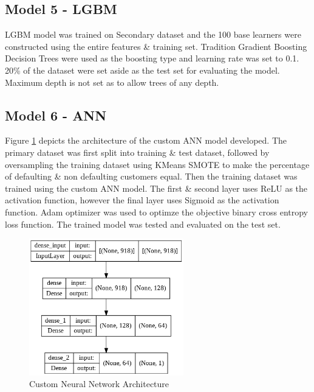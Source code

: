 \documentclass[twoside,11pt,a4paper]{article}
\begin{document}
\subsection{Model 5 - \acf{LGBM}}
\acs{LGBM} model was trained on Secondary dataset and the 100 base learners were constructed using the entire features \& training set. Tradition Gradient Boosting Decision Trees were used as the boosting type and learning rate was set to 0.1. 20\% of the dataset were set aside as the test set for evaluating the model. Maximum depth is not set as to allow trees of any depth. 

\subsection{Model 6 - \acf{ANN}}
Figure \ref{fig:nn_arch} depicts the architecture of the custom \acs{ANN} model developed.  The primary dataset was first split into training \& test dataset, followed by oversampling the training dataset using KMeans \acs{SMOTE} to make the percentage of defaulting \& non defaulting customers equal. Then the training dataset was trained using the custom \acs{ANN} model. The first \& second layer uses \acf{ReLU} as the activation function, however the final layer uses Sigmoid as the activation function. Adam optimizer was used to optimze the objective binary cross entropy loss function. The trained model was tested and evaluated on the test set.\\
\begin{figure}[ht]
	\centering
	\includegraphics[width=0.6\textwidth, height=0.3\textheight]{nn_arch}
	\caption[Custom Neural Network Architecture]{Custom Neural Network Architecture}
	\label{fig:nn_arch}
\end{figure}
\end{document}
